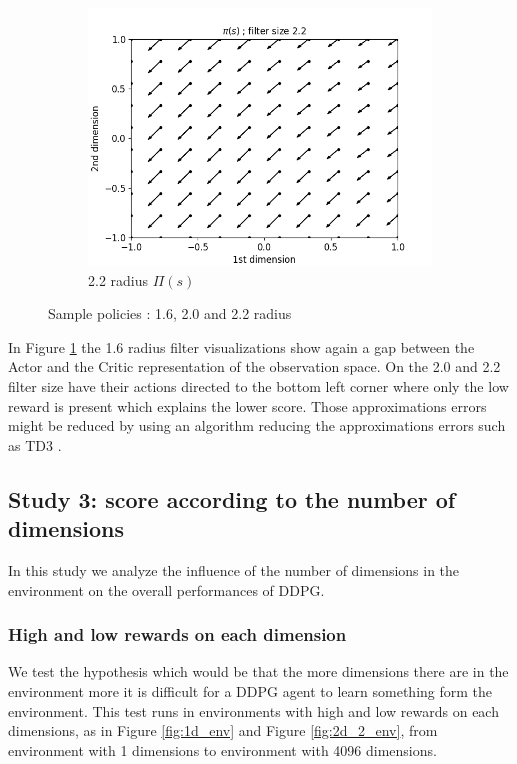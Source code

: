 \documentclass{article}
\begin{document}
\begin{figure}[H]
\begin{subfigure}[b]{0.3\linewidth}
    \includegraphics[width=\linewidth]{Study_2/2.4/visualizations/Pi_arrow_2_2.png}
      \caption{2.2 radius $\Pi(s)$}
  \end{subfigure}
  \caption{Sample policies : 1.6, 2.0 and 2.2 radius}
  \label{fig:sample_policies_corner_sequential}
  \end{figure}
 
 In Figure \ref{fig:sample_policies_corner_sequential} the 1.6 radius filter visualizations show again a gap between the Actor and the Critic representation of the observation space. On the 2.0 and 2.2 filter size have their actions directed to the bottom left corner where only the low reward is present which explains the lower score. Those approximations errors might be reduced by using an algorithm reducing the approximations errors such as TD3 \cite{fujimoto_addressing_2018}.
 
\subsection{Study 3: score according to the number of dimensions}

In this study we analyze the influence of the number of dimensions in the environment on the overall performances of DDPG.

\subsubsection{High and low rewards on each dimension}

We test the hypothesis which would be that the more dimensions there are in the environment more it is difficult for a DDPG agent to learn something form the environment. This test runs in environments with high and low rewards on each dimensions, as in Figure \ref{fig:1d_env} and Figure \ref{fig:2d_2_env}, from environment with 1 dimensions to environment with 4096 dimensions.
\end{document}
